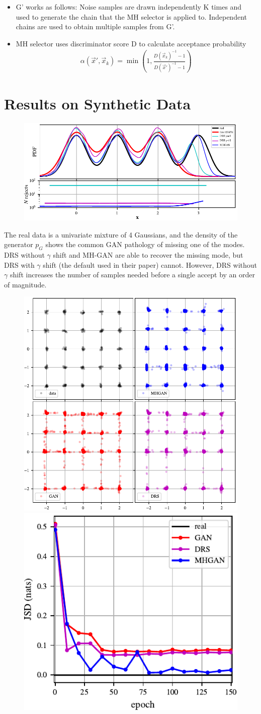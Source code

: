 \documentclass[a0,landscape]{a0poster}
\begin{document}
\begin{multicols}{3}
\begin{itemize}
\item G’ works as follows: Noise samples are drawn independently K times and used to generate the chain that the MH selector is applied to. Independent chains are used to obtain multiple samples from G’.

\item  MH selector uses discriminator score D to calculate acceptance probability  
\begin{align} \alpha(\vec x', \vec x_k) = \min\left(1, \frac{D(\vec x_k)^{-1} - 1}{D(\vec x')^{-1} - 1}\right)\,
\end{align}
\end{itemize}


\section*{\fontsize{67.1}{82} \selectfont \color{NavyBlue} Results on Synthetic Data \color{Black}}
\begin{figure}[H]
\centering
\includegraphics[width=.2\textwidth]{../figures/univariate_example.pdf}
\end{figure}
The real data is a univariate mixture of 4 Gaussians, and the density of the generator $p_G$ shows the common GAN pathology of missing one of the modes. 
DRS without $\gamma$ shift and MH-GAN are able to recover the missing mode, but DRS with $\gamma$ shift (the default used in their paper) cannot. 
However, DRS without $\gamma$ shift increases the number of samples needed before a single accept by an order of magnitude.

\begin{figure}[H]
\centering
\includegraphics[width=.1\textwidth]{../figures/mog_example_150.pdf}
\includegraphics[width=.1\textwidth]{../figures/jsd.pdf}
\end{figure}


\end{multicols}
\end{document}
